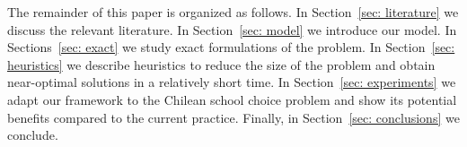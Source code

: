 The remainder of this paper is organized as follows. In Section~\ref{sec: literature} we discuss the relevant literature. In Section~\ref{sec: model} we introduce our model. In Sections~\ref{sec: exact} we study exact formulations of the problem. In Section~\ref{sec: heuristics} we describe heuristics to reduce the size of the problem and obtain near-optimal solutions in a relatively short time. In Section~\ref{sec: experiments} we adapt our framework to the Chilean school choice problem and show its potential benefits compared to the current practice. Finally, in Section~\ref{sec: conclusions} we conclude.
